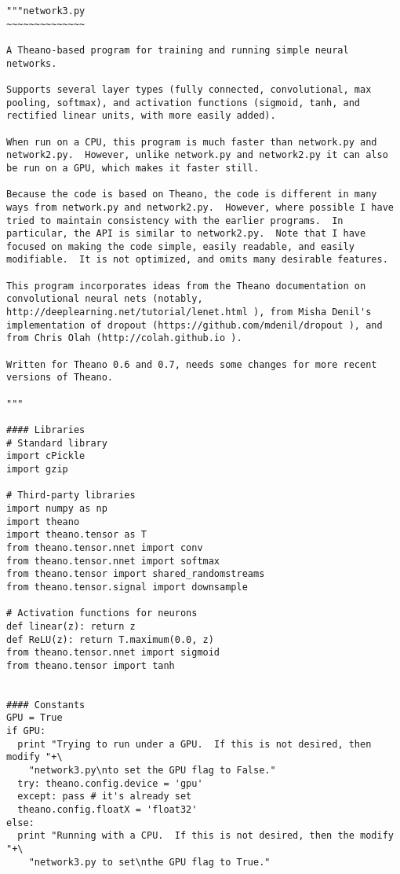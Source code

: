 \documentclass[a4paper,twoside,10pt]{book}
\begin{document}
\begin{lstlisting}
"""network3.py
~~~~~~~~~~~~~~

A Theano-based program for training and running simple neural
networks.

Supports several layer types (fully connected, convolutional, max
pooling, softmax), and activation functions (sigmoid, tanh, and
rectified linear units, with more easily added).

When run on a CPU, this program is much faster than network.py and
network2.py.  However, unlike network.py and network2.py it can also
be run on a GPU, which makes it faster still.

Because the code is based on Theano, the code is different in many
ways from network.py and network2.py.  However, where possible I have
tried to maintain consistency with the earlier programs.  In
particular, the API is similar to network2.py.  Note that I have
focused on making the code simple, easily readable, and easily
modifiable.  It is not optimized, and omits many desirable features.

This program incorporates ideas from the Theano documentation on
convolutional neural nets (notably,
http://deeplearning.net/tutorial/lenet.html ), from Misha Denil's
implementation of dropout (https://github.com/mdenil/dropout ), and
from Chris Olah (http://colah.github.io ).

Written for Theano 0.6 and 0.7, needs some changes for more recent
versions of Theano.

"""

#### Libraries
# Standard library
import cPickle
import gzip

# Third-party libraries
import numpy as np
import theano
import theano.tensor as T
from theano.tensor.nnet import conv
from theano.tensor.nnet import softmax
from theano.tensor import shared_randomstreams
from theano.tensor.signal import downsample

# Activation functions for neurons
def linear(z): return z
def ReLU(z): return T.maximum(0.0, z)
from theano.tensor.nnet import sigmoid
from theano.tensor import tanh


#### Constants
GPU = True
if GPU:
  print "Trying to run under a GPU.  If this is not desired, then modify "+\
    "network3.py\nto set the GPU flag to False."
  try: theano.config.device = 'gpu'
  except: pass # it's already set
  theano.config.floatX = 'float32'
else:
  print "Running with a CPU.  If this is not desired, then the modify "+\
    "network3.py to set\nthe GPU flag to True."


\end{lstlisting}
\end{document}
